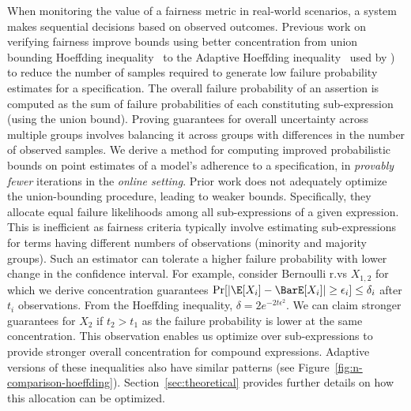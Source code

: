 When monitoring the value of a fairness metric in real-world scenarios, a system makes sequential decisions based on observed outcomes.
Previous work on verifying fairness improve bounds using better concentration from union bounding Hoeffding inequality~\citep{albarghouthi2017fairsquare,albarghouthi2019fairness} to the Adaptive Hoeffding inequality~\citep{zhao2016adaptive} used by \cite{bastani2019probabilistic}) to reduce the number of samples required to generate low failure probability estimates for a specification.
The overall failure probability of an assertion is computed as the sum of failure probabilities of each constituting sub-expression (using the union bound).
Proving guarantees for overall uncertainty across multiple groups involves balancing it across groups with differences in the number of observed samples.
We derive a method for computing improved probabilistic bounds on point estimates of a model's adherence to a specification,
in \emph{provably fewer} iterations in the \emph{online setting}.
Prior work does not adequately optimize the union-bounding procedure, leading to weaker bounds. 
Specifically, they allocate equal failure likelihoods among all sub-expressions of a given expression.
This is inefficient as fairness criteria typically involve estimating sub-expressions for terms having different numbers of observations (minority and majority groups).
Such an estimator can tolerate a higher failure probability with lower change in the confidence interval. 
For example, consider Bernoulli r.vs  $X_{1,2}$ for which we derive concentration guarantees $\Pr[|\E[X_i] - \BarE[X_i]| \geq \epsilon_{i}] \leq \delta_{i}$ after $t_{i}$ observations. 
From the Hoeffding inequality, $\delta = 2e^{-2t\epsilon^2}$.
We can claim stronger guarantees for $X_2$ if $t_2 > t_1$ as the failure probability is lower at the same concentration. 
This observation enables us optimize over sub-expressions to provide stronger overall concentration for compound expressions.
Adaptive versions of these inequalities also have similar patterns (see Figure~\ref{fig:n-comparison-hoeffding}).
Section~\ref{sec:theoretical} provides further details on how this allocation can be optimized.


